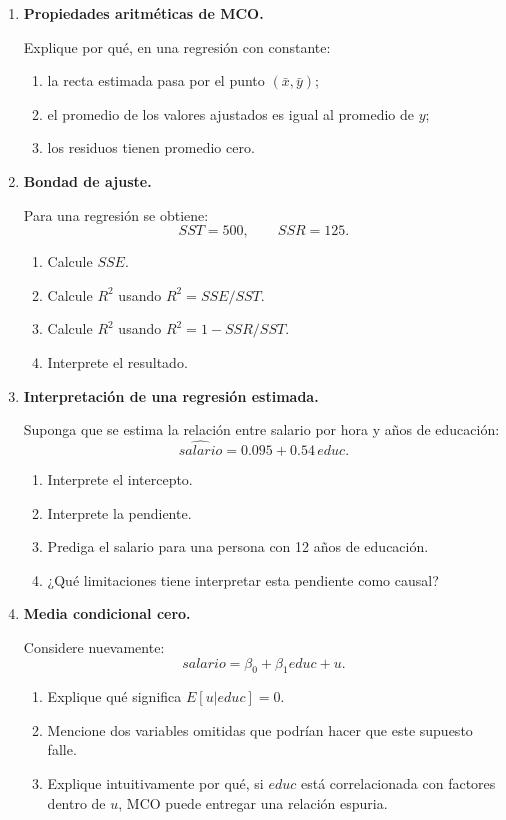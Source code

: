 \documentclass[11pt]{article}
\begin{document}
\begin{enumerate}[label=\textbf{Ejercicio \arabic*.}, leftmargin=*]
    \item \textbf{Propiedades aritméticas de MCO.}
    
    Explique por qué, en una regresión con constante:
    \begin{enumerate}[label=\alph*)]
        \item la recta estimada pasa por el punto $(\bar{x},\bar{y})$;
        \item el promedio de los valores ajustados es igual al promedio de $y$;
        \item los residuos tienen promedio cero.
    \end{enumerate}

    \item \textbf{Bondad de ajuste.}
    
    Para una regresión se obtiene:
    \[
        SST=500,\qquad SSR=125.
    \]
    \begin{enumerate}[label=\alph*)]
        \item Calcule $SSE$.
        \item Calcule $R^2$ usando $R^2=SSE/SST$.
        \item Calcule $R^2$ usando $R^2=1-SSR/SST$.
        \item Interprete el resultado.
    \end{enumerate}

    \item \textbf{Interpretación de una regresión estimada.}
    
    Suponga que se estima la relación entre salario por hora y años de educación:
    \[
        \widehat{salario}=0.095+0.54\,educ.
    \]
    \begin{enumerate}[label=\alph*)]
        \item Interprete el intercepto.
        \item Interprete la pendiente.
        \item Prediga el salario para una persona con 12 años de educación.
        \item ¿Qué limitaciones tiene interpretar esta pendiente como causal?
    \end{enumerate}

    \item \textbf{Media condicional cero.}
    
    Considere nuevamente:
    \[
        salario=\beta_0+\beta_1educ+u.
    \]
    \begin{enumerate}[label=\alph*)]
        \item Explique qué significa $E[u|educ]=0$.
        \item Mencione dos variables omitidas que podrían hacer que este supuesto falle.
        \item Explique intuitivamente por qué, si $educ$ está correlacionada con factores dentro de $u$, MCO puede entregar una relación espuria.
    \end{enumerate}


\end{enumerate}
\end{document}
